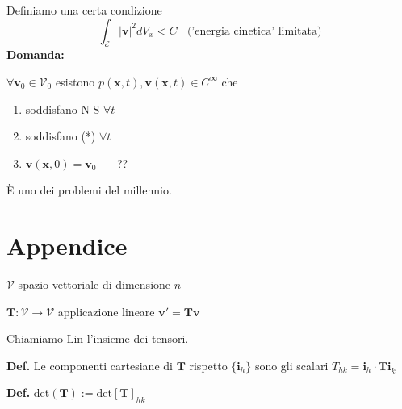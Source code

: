 \documentclass[10pt,a4paper,twoside]{book}
\begin{document}
Definiamo una certa condizione
\begin{equation}
\int _{\mathcal{E}}| \mathbf{v}| ^{2} dV_{x} < C\ \ \ \ \text{('energia cinetica' limitata)} \tag{*}
\end{equation}
\textbf{Domanda:}

$\forall \mathbf{v}_{0} \in \mathcal{V}_{0}$ esistono $p(\mathbf{x} ,t) ,\mathbf{v}(\mathbf{x} ,t) \in C^{\infty }$ che
\begin{enumerate}
\item soddisfano N-S $\forall t$
\item soddisfano (*) $\forall t$
\item $\mathbf{v}(\mathbf{x} ,0) =\mathbf{v}_{0}$ \ \ \ ??
\end{enumerate}



È uno dei problemi del millennio.








































\chapter{Appendice}

$\mathcal{V}$ spazio vettoriale di dimensione $n$

$\mathbf{T} :\mathcal{V}\rightarrow \mathcal{V}$ applicazione lineare $\mathbf{v} '=\mathbf{Tv}$

Chiamiamo $\mathrm{Lin}$ l'insieme dei tensori.



\textbf{\textcolor[rgb]{0.82,0.01,0.11}{Def.}} Le componenti cartesiane di $\mathbf{T}$ rispetto $\{\mathbf{i}_{h}\}$ sono gli scalari $T_{hk} =\mathbf{i}_{h} \cdotp \mathbf{Ti}_{k}$

\textbf{\textcolor[rgb]{0.82,0.01,0.11}{Def.}} $\mathrm{det}(\mathbf{T}) :=\mathrm{det}[\mathbf{T}]_{hk}$
\end{document}
